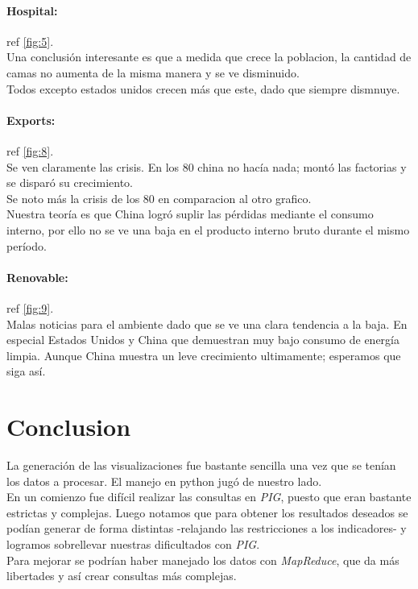 \documentclass{article}
\begin{document}
\paragraph{Hospital:}
ref \ref{fig:5}.\\
Una conclusión interesante es que a medida que crece la poblacion, la cantidad de camas no aumenta de la misma manera y se ve disminuido.\\
Todos excepto estados unidos crecen más que este, dado que siempre dismnuye.

\paragraph{Exports:}
ref \ref{fig:8}.\\
Se ven claramente las crisis. En los 80 china no hacía nada; montó las factorias y se disparó su crecimiento.\\
Se noto más la crisis de los 80 en comparacion al otro grafico. \\

Nuestra teoría es que China logró suplir las pérdidas mediante el consumo interno, por ello no se ve una baja en el producto interno bruto durante el mismo período.

\paragraph{Renovable:}
ref \ref{fig:9}.\\
Malas noticias para el ambiente dado que se ve una clara tendencia a la baja. En especial Estados Unidos y China que demuestran muy bajo consumo de energía limpia. Aunque China muestra un leve crecimiento ultimamente; esperamos que siga así.

\section{Conclusion}

La generación de las visualizaciones fue bastante sencilla una vez que se tenían los datos a procesar. El manejo en python jugó de nuestro lado.\\
En un comienzo fue difícil realizar las consultas en \textit{PIG}, puesto que eran bastante estrictas y complejas. Luego notamos que para obtener los resultados deseados se podían generar de forma distintas -relajando las restricciones a los indicadores- y logramos sobrellevar nuestras dificultados con \textit{PIG}.\\
Para mejorar se podrían haber manejado los datos con \textit{MapReduce}, que da más libertades y así crear consultas más complejas.
\end{document}
